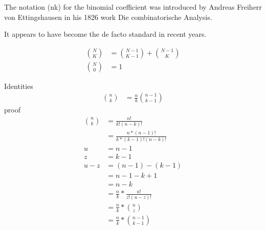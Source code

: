 \documentclass[]{article}
\begin{document}
	
	The notation (nk) for the binomial coefficient was introduced by Andreas Freiherr von Ettingshausen in his 1826 work Die combinatorische Analysis.
	
	It appears to have become the de facto standard in recent years.

\begin{align}
	\binom{N}{K} &= \binom{N - 1}{K - 1} + \binom{N - 1}{K}\\ 
	\binom{N}{0} &= 1
\end{align}

Identities 
\begin{align}
	\binom{n}{k} &= \frac {n}{k} \binom{n-1}{k-1}
\end{align}
proof
\begin{align}
	\binom{n}{k} &= \frac {n!}{k!(n-k)!}\\
	&= \frac{n*(n-1)!}{k*(k-1)!(n-k)!}\\
	u &= n-1\\
	z &= k-1\\
	u-z &= (n-1)-(k-1)\\
	&= n-1-k+1\\
	&= n-k\\
	&= \frac{n}{k} * \frac {u!}{z!(u-z)!}\\
	&= \frac{n}{k} * \binom{u}{z}\\
	&= \frac{n}{k} * \binom{n-1}{k-1}
\end{align}
\end{document}
